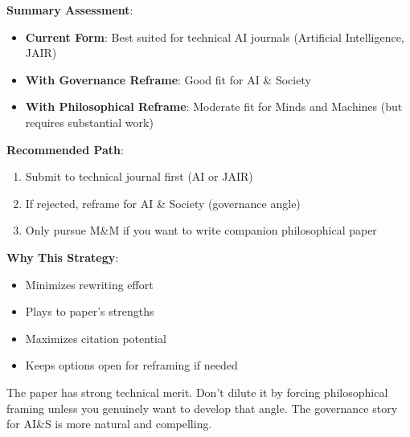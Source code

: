 \documentclass[12pt]{article}
\begin{document}
\textbf{Summary Assessment}:
\begin{itemize}[leftmargin=*]
\item \textbf{Current Form}: Best suited for technical AI journals (Artificial Intelligence, JAIR)
\item \textbf{With Governance Reframe}: Good fit for AI \& Society
\item \textbf{With Philosophical Reframe}: Moderate fit for Minds and Machines (but requires substantial work)
\end{itemize}

\textbf{Recommended Path}:
\begin{enumerate}
\item Submit to technical journal first (AI or JAIR)
\item If rejected, reframe for AI \& Society (governance angle)
\item Only pursue M\&M if you want to write companion philosophical paper
\end{enumerate}

\textbf{Why This Strategy}:
\begin{itemize}[leftmargin=*]
\item Minimizes rewriting effort
\item Plays to paper's strengths
\item Maximizes citation potential
\item Keeps options open for reframing if needed
\end{itemize}

The paper has strong technical merit. Don't dilute it by forcing philosophical framing unless you genuinely want to develop that angle. The governance story for AI\&S is more natural and compelling.
\end{document}
